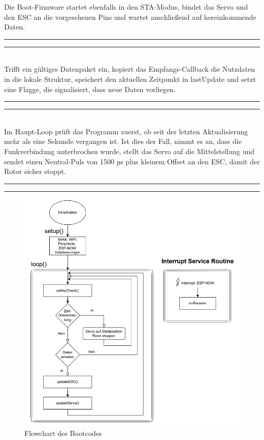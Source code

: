 \documentclass[a4paper,12pt]{article}
\begin{document}
Die Boot-Firmware startet ebenfalls in den STA-Modus, bindet das Servo und den ESC an die vorgesehenen Pins und wartet anschließend auf hereinkommende Daten.
\newline\noindent\rule{\linewidth}{0.4pt}  %

\noindent\rule{\linewidth}{0.4pt}\\[0.5em]  %
Trifft ein gültiges Datenpaket ein, kopiert das Empfangs-Callback die Nutzdaten in die lokale Struktur, speichert den aktuellen Zeitpunkt in lastUpdate und setzt eine Flagge, die signalisiert, dass neue Daten vorliegen. 
\newline\noindent\rule{\linewidth}{0.4pt}  %

\noindent\rule{\linewidth}{0.4pt}\\[0.5em]  %
Im Haupt-Loop prüft das Programm zuerst, ob seit der letzten Aktualisierung mehr als eine Sekunde vergangen ist. Ist dies der Fall, nimmt es an, dass die Funkverbindung unterbrochen wurde, stellt das Servo auf die Mittelstellung und sendet einen Neutral-Puls von 1500 µs plus kleinem Offset an den ESC, damit der Rotor sicher stoppt.
\newline\noindent\rule{\linewidth}{0.4pt}  %

\noindent\rule{\linewidth}{0.4pt}  %
\begin{figure}[H]
    \centering
    \includegraphics[width=0.9\linewidth]{images/boatFlowchart.png}
    \caption{Flowchart des Bootcodes}
    \label{Boat-Flowchart}
\end{figure}
\end{document}
